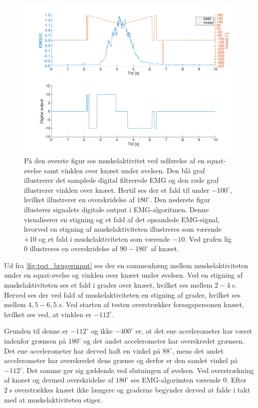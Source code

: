\begin{figure}[H]
\centering
\includegraphics[width=1\textwidth]{figures/test_brugerinput}
\caption{På den øverste figur ses muskelaktivitet ved udførelse af en squat-øvelse samt vinklen over knæet under øvelsen. Den blå graf illustrerer det samplede digital filtrerede EMG og den røde graf illustrerer vinklen over knæet. Hertil ses der et fald til under $-100^{\circ}$, hvilket illustrerer en overskridelse af $180^{\circ}$. Den nederste figur illusterer signalets digitale output i EMG-algoritmen. Denne visualiserer en stigning og et fald af det opsamlede EMG-signal, hvorved en stigning af muskelaktiviteten illustreres som værende $+10$ og et fald i muskelaktiviteten som værende $-10$. Ved grafen lig 0 illustreres en overskridelse af $90-180^{\circ}$ af knæet.}
\label{fig:test_brugerinput}
\end{figure}

\noindent
Ud fra \autoref{fig:test_brugerinput} ses der en sammenhæng mellem muskelaktiviteten under en squat-øvelse og vinklen over knæet under øvelsen. Ved en stigning af muskelaktiviteten ses et fald i grader over knæet, hvilket ses mellem $2-4~s$. Herved ses der ved fald af muskelaktiviteten en stigning af grader, hvilket ses mellem $4,5-6,5~s$.
Ved starten af testen overstrækker forsøgspersonen knæet, hvilket ses ved, at vinklen er $-112^{\circ}$. 

Grunden til denne er $-112^{\circ}$ og ikke $-400^{\circ}$ er, at det ene accelerometer har været indenfor grænsen på $180^{\circ}$ og det andet accelerometer har overskredet grænsen. Det ene accelerometer har derved haft en vinkel på $88^{\circ}$, mens det andet accelerometer har overskredet dens grænse og derfor er den samlet vinkel på $-112^{\circ}$. Det samme gør sig gældende ved slutningen af øvelsen. Ved overstrækning af knæet og dermed overskridelse af $180^{\circ}$ ses EMG-algorimten værende 0. 
Efter $2~s$ overstrækkes knæet ikke længere og graderne begynder derved at falde i takt med at muskelaktiviteten stiger. 

